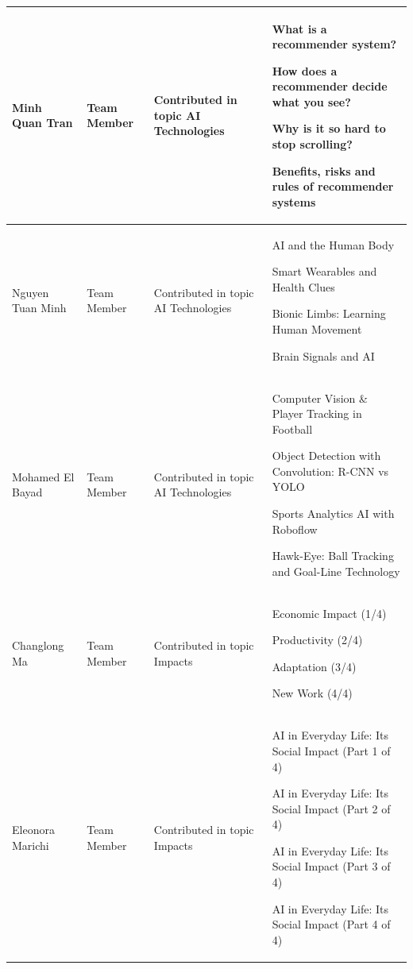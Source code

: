 \documentclass[11pt]{article}
\begin{document}
\begin{longtable} [c] {|p{3cm}|l|p{7cm}|p{4cm}|}
	Minh Quan Tran & Team Member &
	\par \textbullet{} Contributed in topic AI Technologies &
	\par \textbullet{} What is a recommender system?
	\par \textbullet{} How does a recommender decide what you see?
	\par \textbullet{} Why is it so hard to stop scrolling?
	\par \textbullet{} Benefits, risks and rules of recommender systems \\ 
	\hline
	
	Nguyen Tuan Minh & Team Member &
	\par \textbullet{} Contributed in topic AI Technologies &
	\par \textbullet{} AI and the Human Body
	\par \textbullet{} Smart Wearables and Health Clues
	\par \textbullet{} Bionic Limbs: Learning Human Movement
	\par \textbullet{} Brain Signals and AI \\ 
	\hline
	
	Mohamed El Bayad & Team Member &
	\par \textbullet{} Contributed in topic AI Technologies &
	\par \textbullet{} Computer Vision \& Player Tracking in Football
	\par \textbullet{} Object Detection with Convolution: R-CNN vs YOLO
	\par \textbullet{} Sports Analytics AI with Roboflow
	\par \textbullet{} Hawk-Eye: Ball Tracking and Goal-Line Technology \\ 
	\hline
	
	Changlong Ma & Team Member &
	\par \textbullet{} Contributed in topic Impacts &
	\par \textbullet{} Economic Impact (1/4)
	\par \textbullet{} Productivity (2/4)
	\par \textbullet{} Adaptation (3/4)
	\par \textbullet{} New Work (4/4) \\ 
	\hline
	
	Eleonora Marichi & Team Member &
	\par \textbullet{} Contributed in topic Impacts &
	\par \textbullet{} AI in Everyday Life: Its Social Impact (Part 1 of 4)
	\par \textbullet{} AI in Everyday Life: Its Social Impact (Part 2 of 4)
	\par \textbullet{} AI in Everyday Life: Its Social Impact (Part 3 of 4)
	\par \textbullet{} AI in Everyday Life: Its Social Impact (Part 4 of 4) \\ 
	\hline
	

\end{longtable}
\end{document}
